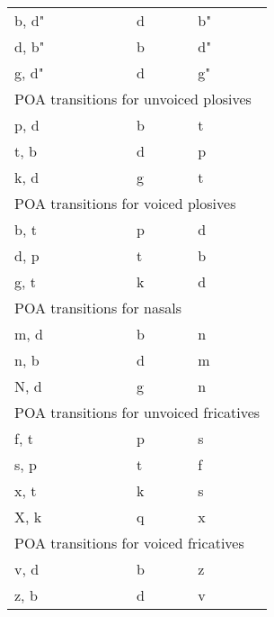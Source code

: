 \documentclass[6pt]{article}
\begin{document}
\begin{longtable}{ l | l | l }
b, d" & d & b" \\
d, b" & b & d" \\
g, d" & d & g" \\

\hline \multicolumn{3}{l}{POA transitions for unvoiced plosives}\\  \hline
p, d & b & t \\
t, b & d & p \\
k, d & g & t \\

\hline \multicolumn{3}{l}{POA transitions for voiced plosives}\\  \hline

b, t & p & d \\
d, p & t & b \\
g, t & k & d \\

\hline \multicolumn{3}{l}{POA transitions for  nasals}\\  \hline

m, d & b & n \\
n, b & d & m \\
N, d & g & n \\

\hline \multicolumn{3}{l}{POA transitions for unvoiced fricatives}\\  \hline

f, t & p & s \\
s, p & t & f \\
x, t & k & s \\
X, k & q & x \\

\hline \multicolumn{3}{l}{POA transitions for voiced fricatives}\\  \hline

v, d & b & z \\
z, b & d & v \\
\end{longtable}

\newpage
\end{document}
